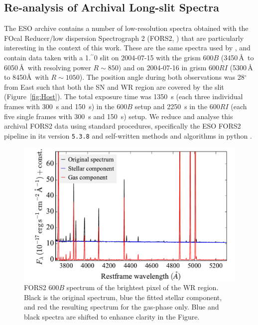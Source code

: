 \documentclass[traditabstract]{aa}
\newcommand{\farc}{\hbox{$.\!\!^{\prime\prime}$}}
\begin{document}
\begin{appendix}

\section{Re-analysis of Archival Long-slit Spectra}
\label{app:fors}
The ESO archive contains a number of low-resolution spectra obtained with the FOcal Reducer/low dispersion Spectrograph 2 (FORS2, \citealt{1998Msngr..94....1A}) that are particularly interesting in the context of this work. These are the same spectra used by \citet{2006A&A...454..103H}, and contain data taken with a 1\farc{0} slit on 2004-07-15 with the grism 600$B$ (3450\,\AA\, to 6050\,\AA\, with resolving power $R\sim850$) and on 2004-07-16 in grism 600$RI$ (5300\,\AA\, to 8450\AA\, with $R\sim1050$). The position angle during both observations was 28$^\circ$ from East such that both the SN and WR region are covered by the slit (Figure~\ref{fig:Host}). The total exposure time was 1350~s (each three individual frames with 300~s and 150~s) in the 600$B$ setup and 2250~s in the 600$RI$ (each five single frames with 300~s and 150~s) setup. We reduce and analyse this archival FORS2 data using standard procedures, specifically the ESO FORS2 pipeline in its version \texttt{5.3.8} and self-written methods and algorithms in python \citep{2015A&A...581A.125K}.

\begin{figure}
\includegraphics[angle=0, width=0.9\columnwidth]{Figs/FORS2_3700_5301_starlight.pdf}
\caption{FORS2 600$B$ spectrum of the brightest pixel of the WR region. Black is the original spectrum, blue the fitted stellar component, and red the resulting spectrum for the gas-phase only. Blue and black spectra are shifted to enhance clarity in the Figure.}
\label{fig:FORSSN}
\end{figure}


\end{appendix}
\end{document}
